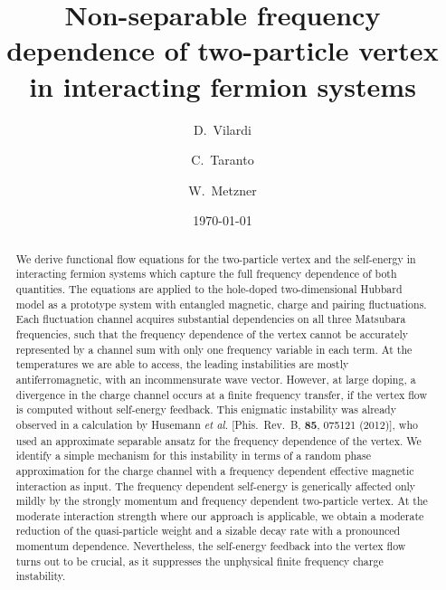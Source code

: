 \documentclass[aps,prb,twocolumn,showpacs,groupedaddress,
longbibliography]{revtex4-1}
\begin{document}
\title{Non-separable frequency dependence of two-particle vertex \\ 
        in interacting fermion systems}

\author {D.~Vilardi}
\author{C.~Taranto}
\author{W.~Metzner}

\date{\today}

\begin{abstract}
We derive functional flow equations for the two-particle vertex and the self-energy in interacting fermion systems which capture the full frequency dependence of both quantities. The equations are applied to the hole-doped two-dimensional Hubbard model as a prototype system with entangled magnetic, charge and pairing fluctuations. Each fluctuation channel acquires substantial dependencies on all three Matsubara frequencies, such that the frequency dependence of the vertex cannot be accurately represented by a channel sum with only one frequency variable in each term. At the temperatures we are able to access, the leading instabilities are mostly antiferromagnetic, with an incommensurate wave vector. However, at large doping, a divergence in the charge channel occurs at a finite frequency transfer, if the vertex flow is computed without self-energy feedback. This enigmatic instability was already observed in a calculation by Husemann \emph{et al.} [Phis.~Rev.~B, \textbf{85}, 075121 (2012)], who used an approximate separable ansatz for the frequency dependence of the vertex. We identify a simple mechanism for this instability in terms of a random phase approximation for the charge channel with a frequency dependent effective magnetic interaction as input.
The frequency dependent self-energy is generically affected only mildly by the strongly momentum and frequency dependent two-particle vertex. At the moderate interaction strength where our approach is applicable, we obtain a moderate reduction of the quasi-particle weight and a sizable decay rate with a pronounced momentum dependence. Nevertheless, the self-energy feedback into the vertex flow turns out to be crucial, as it suppresses the unphysical finite frequency charge instability.
\end{abstract}

\pacs{}
\maketitle
\end{document}
